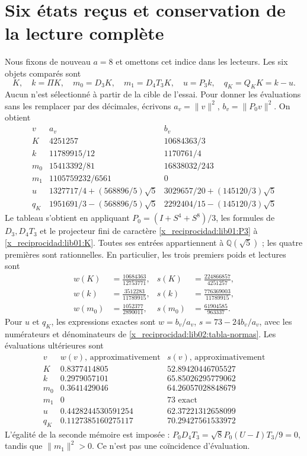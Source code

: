 \section{Six états reçus et conservation de la lecture complète}
\label{x_reciprocidad:lib02:seis-estados}

Nous fixons de nouveau \(a=8\) et omettons cet indice dans les lecteurs.
Les six objets comparés sont
\[
 K,\quad k=\Pi K,\quad m_0=D_3K,\quad m_1=D_4T_3K,
 \quad u=P_3k,\quad q_K=Q_KK=k-u.
\]
Aucun n’est sélectionné à partir de la cible de l’essai. Pour donner les
évaluations sans les remplacer par des décimales, écrivons
\(a_v=\|v\|^2\), \(b_v=\|P_0v\|^2\). On obtient
\begin{equation}
\begin{array}{c|c|c}
 v&a_v&b_v\\\hline
 K&4251257&10684363/3\\
 k&11789915/12&1170761/4\\
 m_0&15413392/81&16838032/243\\
 m_1&1105759232/6561&0\\
 u&1327717/4+(568896/5)\sqrt5
   &3029657/20+(145120/3)\sqrt5\\
 q_K&1951691/3-(568896/5)\sqrt5
   &2292404/15-(145120/3)\sqrt5
\end{array}
 \label{x_reciprocidad:lib02:tabla-normas}
\end{equation}
Le tableau s'obtient en appliquant \(P_0=(I+S^4+S^8)/3\), les formules de \(D_3,D_4T_3\) et le projecteur fini de caractère \eqref{x_reciprocidad:lib01:P3} à \eqref{x_reciprocidad:lib01:K}. Toutes ses entrées appartiennent à \(\mathbb Q(\sqrt5)\) ; les quatre premières sont rationnelles. En particulier, les trois premiers poids et lectures sont
\begin{align*}
 w(K)&=\frac{10684363}{12753771},&
 s(K)&=\frac{224866857}{4251257},\\
 w(k)&=\frac{3512283}{11789915},&
 s(k)&=\frac{776369003}{11789915},\\
 w(m_0)&=\frac{1052377}{2890011},&
 s(m_0)&=\frac{61904585}{963337}.
\end{align*}
Pour \(u\) et \(q_K\), les expressions exactes sont
\(w=b_v/a_v\), \(s=73-24b_v/a_v\), avec les numérateurs et
dénominateurs de \eqref{x_reciprocidad:lib02:tabla-normas}. Les évaluations ultérieures
sont
\[
\begin{array}{c|c|c}
 v&w(v)\text{, approximativement}&s(v)\text{, approximativement}\\\hline
 K&0.8377414805&52.89420446705527\\
 k&0.2979057101&65.85026295779062\\
 m_0&0.3641429046&64.26057028848679\\
 m_1&0&73\text{ exact}\\
 u&0.4428244530591254&62.37221312658099\\
 q_K&0.1127385160275117&70.29427561533972
\end{array}
\]
L’égalité de la seconde mémoire est imposée :
\(P_0D_4T_3=\sqrt8P_0(U-I)T_3/9=0\), tandis que
\(\|m_1\|^2>0\). Ce n’est pas une coïncidence d’évaluation.

